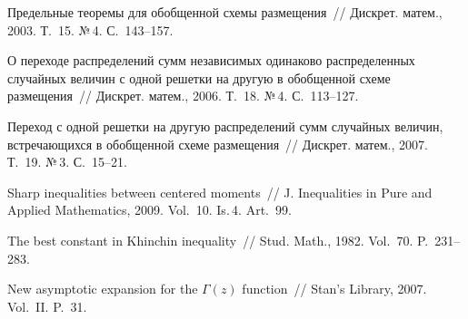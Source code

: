 \begin{multicols}{2}
{{\begin{thebibliography}{9}
Предельные теоремы для обобщенной схемы размещения~// Дискрет. матем., 2003. Т.~15. №\,4. С.~143--157.

О переходе распределений сумм
независимых одинаково распределенных случайных величин с одной
решетки на другую в обобщенной схеме размещения~// Дискрет. матем.,
2006. Т.~18. №\,4. С.~113--127.

 Переход с одной решетки на
другую распределений сумм случайных величин, встречающихся в
обобщенной схеме размещения~// Дискрет. матем., 2007. Т.~19. №\,3. С.~15--21.

Sharp inequalities between centered moments~// 
J. Inequalities in Pure and Applied Mathematics, 2009.
Vol.~10. Is.\,4. Art.~99.

The best constant in Khinchin inequality~// Stud. Math., 1982. Vol.~70. P.~231--283.

\label{end\stat}

New asymptotic expansion for the  $\Gamma(z)$ function~// Stan's Library, 2007. Vol.~II. P.~31.
 \end{thebibliography}
}
}


\end{multicols}